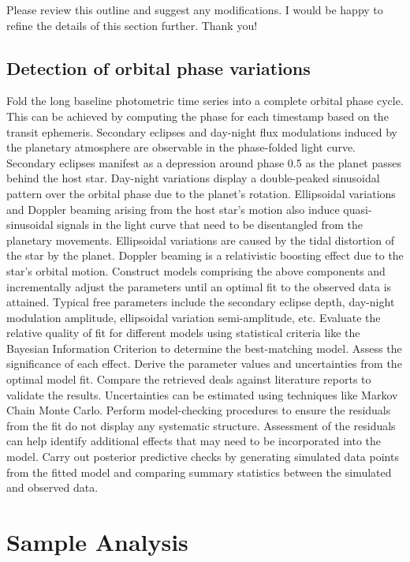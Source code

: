 \documentclass{article}
\begin{document}
Please review this outline and suggest any modifications. I would be happy to refine the details of this section further. Thank you!

\subsection{Detection of orbital phase variations}

Fold the long baseline photometric time series into a complete orbital phase cycle. This can be achieved by computing the phase for each timestamp based on the transit ephemeris. Secondary eclipses and day-night flux modulations induced by the planetary atmosphere are observable in the phase-folded light curve. Secondary eclipses manifest as a depression around phase 0.5 as the planet passes behind the host star. Day-night variations display a double-peaked sinusoidal pattern over the orbital phase due to the planet's rotation. Ellipsoidal variations and Doppler beaming arising from the host star's motion also induce quasi-sinusoidal signals in the light curve that need to be disentangled from the planetary movements. Ellipsoidal variations are caused by the tidal distortion of the star by the planet. Doppler beaming is a relativistic boosting effect due to the star's orbital motion.  Construct models comprising the above components and incrementally adjust the parameters until an optimal fit to the observed data is attained. Typical free parameters include the secondary eclipse depth, day-night modulation amplitude, ellipsoidal variation semi-amplitude, etc. Evaluate the relative quality of fit for different models using statistical criteria like the Bayesian Information Criterion to determine the best-matching model. Assess the significance of each effect. Derive the parameter values and uncertainties from the optimal model fit. Compare the retrieved deals against literature reports to validate the results. Uncertainties can be estimated using techniques like Markov Chain Monte Carlo. Perform model-checking procedures to ensure the residuals from the fit do not display any systematic structure. Assessment of the residuals can help identify additional effects that may need to be incorporated into the model. Carry out posterior predictive checks by generating simulated data points from the fitted model and comparing summary statistics between the simulated and observed data. 

\section{Sample Analysis}
\end{document}
